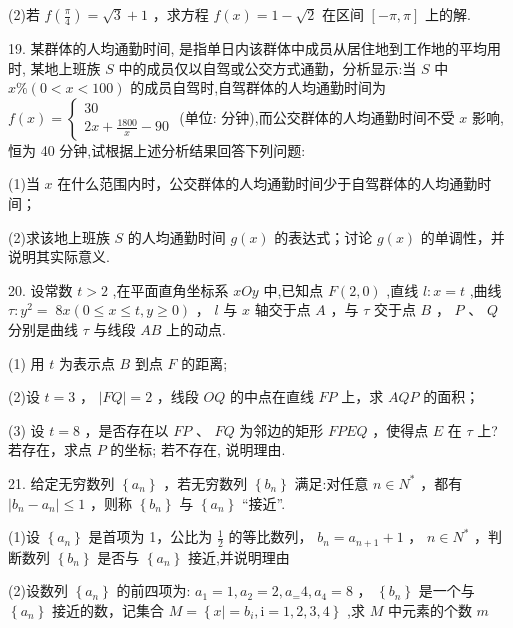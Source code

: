 \documentclass[10pt]{article}
\begin{document}
(2)若 \(f\left( \frac{\pi }{4}\right)  = \sqrt{3} + 1\) ，求方程 \(f\left( x\right)  = 1 - \sqrt{2}\) 在区间 \(\left\lbrack  {-\pi ,\pi }\right\rbrack\) 上的解.

19. 某群体的人均通勤时间, 是指单日内该群体中成员从居住地到工作地的平均用时, 某地上班族 \(S\) 中的成员仅以自驾或公交方式通勤，分析显示:当 \(S\) 中 \(x\% \left( {0 < x < {100}}\right)\) 的成员自驾时,自驾群体的人均通勤时间为 \(f\left( x\right)  = \left\{  \begin{array}{l} {30} \\  {2x} + \frac{1800}{x} - {90} \end{array}\right.\) (单位: 分钟),而公交群体的人均通勤时间不受 \(x\) 影响,恒为 40 分钟,试根据上述分析结果回答下列问题:

(1)当 \(x\) 在什么范围内时，公交群体的人均通勤时间少于自驾群体的人均通勤时间；

(2)求该地上班族 \(S\) 的人均通勤时间 \(g\left( x\right)\) 的表达式；讨论 \(g\left( x\right)\) 的单调性，并说明其实际意义.

20. 设常数 \(t > 2\) ,在平面直角坐标系 \({xOy}\) 中,已知点 \(F\left( {2,0}\right)\) ,直线 \(l : x = t\) ,曲线 \(\tau  : {y}^{2} = \; {8x}\left( {0 \leq  x \leq  t,y \geq  0}\right)\) ， \(l\) 与 \(x\) 轴交于点 \(A\) ，与 \(\tau\) 交于点 \(B\) ， \(P\) 、 \(Q\) 分别是曲线 \(\tau\) 与线段 \({AB}\) 上的动点.

(1) 用 \(t\) 为表示点 \(B\) 到点 \(F\) 的距离;

(2)设 \(t = 3\) ， \(\left| {FQ}\right|  = 2\) ，线段 \({OQ}\) 的中点在直线 \({FP}\) 上，求 \({AQP}\) 的面积；

(3) 设 \(t = 8\) ，是否存在以 \({FP}\) 、 \({FQ}\) 为邻边的矩形 \({FPEQ}\) ，使得点 \(E\) 在 \(\tau\) 上? 若存在，求点 \(P\) 的坐标; 若不存在, 说明理由.

21. 给定无穷数列 \(\left\{  {a}_{n}\right\}\) ，若无穷数列 \(\left\{  {b}_{n}\right\}\) 满足:对任意 \(n \in  {N}^{ * }\) ，都有 \(\left| {{b}_{n} - {a}_{n}}\right|  \leq  1\) ，则称 \(\left\{  {b}_{n}\right\}\) 与 \(\left\{  {a}_{n}\right\}\) “接近”.

(1)设 \(\left\{  {a}_{n}\right\}\) 是首项为 1，公比为 \(\frac{1}{2}\) 的等比数列， \({b}_{n} = {a}_{n + 1} + 1\) ， \(n \in  {N}^{ * }\) ，判断数列 \(\left\{  {b}_{n}\right\}\) 是否与 \(\left\{  {a}_{n}\right\}\) 接近,并说明理由

(2)设数列 \(\left\{  {a}_{n}\right\}\) 的前四项为: \({a}_{1} = 1,{a}_{2} = 2,{a}_{ = }4,{a}_{4} = 8\) ， \(\left\{  {b}_{n}\right\}\) 是一个与 \(\left\{  {a}_{n}\right\}\) 接近的数，记集合 \(M = \left\{  {x \mid   = {b}_{i},\mathrm{i} = 1,2,3,4}\right\}\) ,求 \(M\) 中元素的个数 \(m\)
\end{document}
